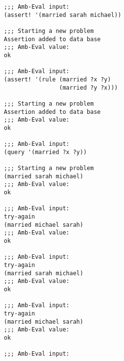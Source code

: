 \documentclass[a4paper,12pt]{article}
\begin{document}
\begin{lstlisting}
;;; Amb-Eval input:
(assert! '(married sarah michael))

;;; Starting a new problem 
Assertion added to data base
;;; Amb-Eval value:
ok

;;; Amb-Eval input:
(assert! '(rule (married ?x ?y)
                (married ?y ?x)))

;;; Starting a new problem 
Assertion added to data base
;;; Amb-Eval value:
ok

;;; Amb-Eval input:
(query '(married ?x ?y))

;;; Starting a new problem 
(married sarah michael)
;;; Amb-Eval value:
ok

;;; Amb-Eval input:
try-again
(married michael sarah)
;;; Amb-Eval value:
ok

;;; Amb-Eval input:
try-again
(married sarah michael)
;;; Amb-Eval value:
ok

;;; Amb-Eval input:
try-again
(married michael sarah)
;;; Amb-Eval value:
ok

;;; Amb-Eval input:
\end{lstlisting}
\end{document}
